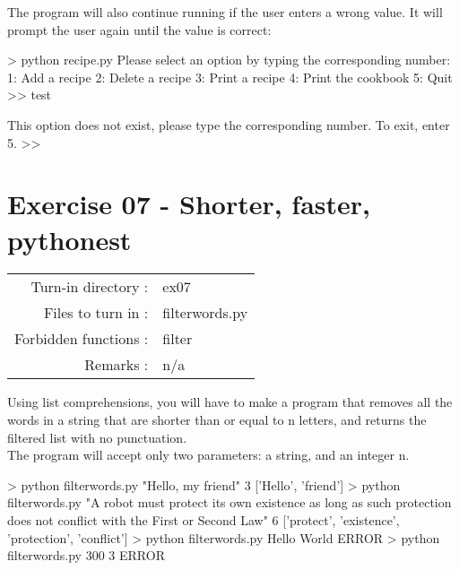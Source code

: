 \documentclass[]{article}
\newenvironment{Shaded}{\begin{snugshade}}{\end{snugshade}}
\newcommand{\NormalTok}[1]{\textcolor[rgb]{0.81,0.81,0.76}{#1}}
\begin{document}
The program will also continue running if the user enters a wrong value.
It will prompt the user again until the value is correct:

\begin{Shaded}
\begin{Highlighting}[]
\NormalTok{> python recipe.py}
\NormalTok{Please select an option by typing the corresponding number:}
\NormalTok{1: Add a recipe}
\NormalTok{2: Delete a recipe}
\NormalTok{3: Print a recipe}
\NormalTok{4: Print the cookbook}
\NormalTok{5: Quit}
\NormalTok{>> test}

\NormalTok{This option does not exist, please type the corresponding number.}
\NormalTok{To exit, enter 5.}
\NormalTok{>> }
\end{Highlighting}
\end{Shaded}

\clearpage

\hypertarget{exercise-07---shorter-faster-pythonest-1}{%
\section{Exercise 07 - Shorter, faster,
pythonest}\label{exercise-07---shorter-faster-pythonest-1}}

\begin{longtable}[]{@{}rl@{}}
\toprule
\endhead
Turn-in directory : & ex07\tabularnewline
Files to turn in : & filterwords.py\tabularnewline
Forbidden functions : & filter\tabularnewline
Remarks : & n/a\tabularnewline
\bottomrule
\end{longtable}

Using list comprehensions, you will have to make a program that removes
all the words in a string that are shorter than or equal to n letters,
and returns the filtered list with no punctuation.\\
The program will accept only two parameters: a string, and an integer n.

\begin{Shaded}
\begin{Highlighting}[]
\NormalTok{> python filterwords.py "Hello, my friend" 3}
\NormalTok{['Hello', 'friend']}
\NormalTok{>  python filterwords.py "A robot must protect its own existence as long as such protection does not conflict with the First or Second Law" 6}
\NormalTok{['protect', 'existence', 'protection', 'conflict']}
\NormalTok{> python filterwords.py Hello World}
\NormalTok{ERROR}
\NormalTok{> python filterwords.py 300 3}
\NormalTok{ERROR}
\end{Highlighting}
\end{Shaded}
\end{document}
